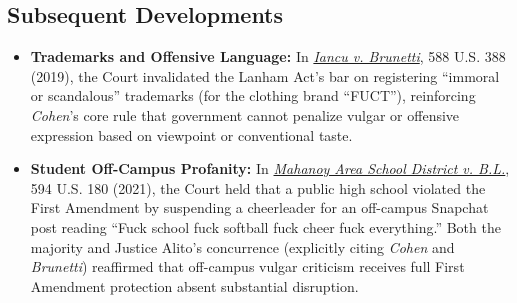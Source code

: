 \documentclass[12pt]{article}
\begin{document}
\subsection{Subsequent Developments}

\begin{itemize}
  \item \textbf{Trademarks and Offensive Language:} In \href{https://supreme.justia.com/cases/federal/us/588/18-302/}{\textit{Iancu v. Brunetti}}, 588 U.S. 388 (2019), the Court invalidated the Lanham Act's bar on registering ``immoral or scandalous'' trademarks (for the clothing brand ``FUCT''), reinforcing \textit{Cohen}'s core rule that government cannot penalize vulgar or offensive expression based on viewpoint or conventional taste.
  \item \textbf{Student Off-Campus Profanity:} In \href{https://supreme.justia.com/cases/federal/us/594/20-255/}{\textit{Mahanoy Area School District v. B.L.}}, 594 U.S. 180 (2021), the Court held that a public high school violated the First Amendment by suspending a cheerleader for an off-campus Snapchat post reading ``Fuck school fuck softball fuck cheer fuck everything.'' Both the majority and Justice Alito's concurrence (explicitly citing \textit{Cohen} and \textit{Brunetti}) reaffirmed that off-campus vulgar criticism receives full First Amendment protection absent substantial disruption.

\end{itemize}
\end{document}
